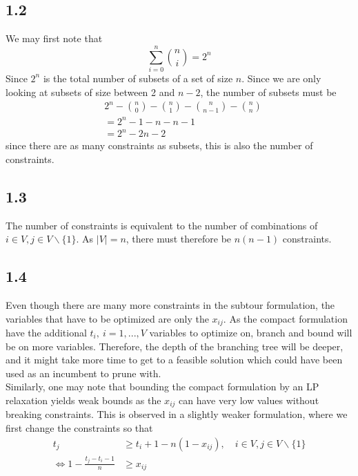 \documentclass[12pt]{article}
\begin{document}
\subsection*{1.2}

We may first note that 
$$
\sum_{i=0}^n\binom{n}{i} = 2^n
$$
Since $2^n$ is the total number of subsets of a set of size $n$. Since we are only looking at subsets of size between 2 and $n-2$, the number of subsets must be 
\begin{align*}
&2^n - \binom{n}{0} - \binom{n}{1} - \binom{n}{n-1} - \binom{n}{n} \\
&=2^n - 1 - n - n - 1 \\&= 2^n - 2n - 2 
\end{align*}
since there are as many constraints as subsets, this is also the number of constraints.

\subsection*{1.3}

The number of constraints is equivalent to the number of combinations of $i \in V, j \in V \backslash\{1\}$. As $|V| = n$, there must therefore be $n(n-1)$ constraints.

\subsection*{1.4}

Even though there are many more constraints in the subtour formulation, the variables that have to be optimized are only the $x_{ij}$. As the compact formulation have the additional $t_i, \ i = 1,...,V$ variables to optimize on, branch and bound will be on more variables. Therefore, the depth of the branching tree will be deeper, and it might take more time to get to a feasible solution which could have been used as an incumbent to prune with.\\

Similarly, one may note that bounding the compact formulation by an LP relaxation yields weak bounds as the $x_{ij}$ can have very low values without breaking constraints. This is observed in a slightly weaker formulation, where we first change the constraints so that
\begin{align*}
t_j & \geq t_i + 1 - n(1 - x_{ij}), \quad i\in V, j\in V\backslash \{1\}\\
\Leftrightarrow 1 - \frac{t_j - t_i - 1}{n} & \geq x_{ij}
\end{align*}
\end{document}
